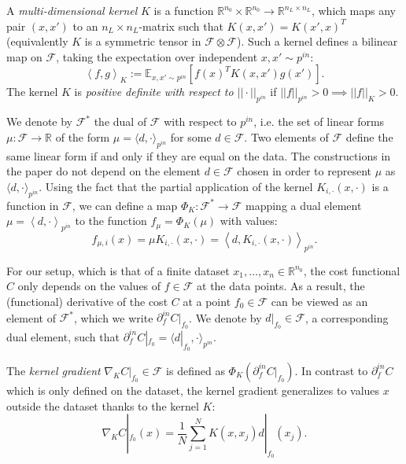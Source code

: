 \documentclass{article}
\begin{document}
A \emph{multi-dimensional kernel}  $K$ is a function $\mathbb{R}^{n_{0}}\times\mathbb{R}^{n_{0}}\to\mathbb{R}^{n_{L}\times n_{L}}$, which maps any pair $(x,x')$ to an $n_{L}\times n_{L}$-matrix such that $K(x, x') = K(x', x)^T$ (equivalently $K$ is a symmetric tensor in $\mathcal{F}\otimes\mathcal{F}$). Such a kernel defines a bilinear map on $\mathcal{F}$, taking the expectation over independent $x, x' \sim p^{in}$:
$$
\left<f, g \right>_K := \mathbb{E}_{x, x' \sim p^{in}} \left[f(x)^T K(x, x') g(x') \right].
$$
The kernel $K$ is \emph{positive definite with respect to  $|| \cdot ||_{p^{in}} $}  if $ || f ||_{p^{in}} > 0 \implies || f ||_K > 0$.

We denote by $ \mathcal{F}^{*} $ the dual of $ \mathcal{F} $ with respect to $ p^{in} $, i.e. the set of linear forms $ \mu: \mathcal {F} \to \mathbb{R} $ of the form $ \mu = \langle d, \cdot \rangle_{p^{in}} $ for some $ d \in \mathcal{F} $.  Two elements of $\mathcal{F}$ define the same linear form if and only if they are equal on the data. The constructions in the paper do not depend on the element $d \in \mathcal{F}$ chosen in order to represent $ \mu$ as $\langle d, \cdot \rangle_{p^{in}}$. Using the fact that the partial application of the kernel $K_{i, \cdot}(x, \cdot)$ is a function in $\mathcal{F}$, we can define a map $\Phi_K : \mathcal{F}^* \to \mathcal{F}$ mapping a dual element $\mu = \left<d, \cdot\right>_{p^{in}}$ to the function $f_\mu = \Phi_K(\mu)$ with values:
$$
f_{\mu, i}(x) = \mu K_{i, \cdot}(x, \cdot) =  \left< d, K_{i, \cdot}(x, \cdot) \right>_{p^{in}}.
$$


For our setup, which is that of a finite dataset $ x_1, \ldots, x_n \in \mathbb{R}^{n_0} $, the cost functional $ C $ only depends on the values of $ f \in \mathcal{F} $ at the data points. As a result, the (functional) derivative of the cost $ C $ at a point $f_0\in\mathcal{F}$ can be viewed as an element of $ \mathcal{F}^{*} $, which we write $ \partial_f^{in} C |_{f_0} $. We denote by  $ d |_{f_0} \in \mathcal{F} $, a corresponding dual element, such that $ \partial_f^{in} C|_{f_0}  = \langle d |_{f_0},  \cdot \rangle_{p^{in}} $.

The \emph{kernel gradient} $\nabla_K C|_{f_0} \in \mathcal{F}$ is defined as $\Phi_K \left( \partial_f^{in} C|_{f_0} \right) $. In contrast to $ \partial_f^{in} C $ which is only defined on the dataset,  the kernel gradient generalizes to values $x$ outside the dataset thanks to the kernel $K$: 
\[
	\nabla_K C|_{f_0} (x) = \frac{1}{N} \sum_{j=1}^{N} K(x, x_j) d|_{f_0} (x_j) .
\] 
\end{document}
